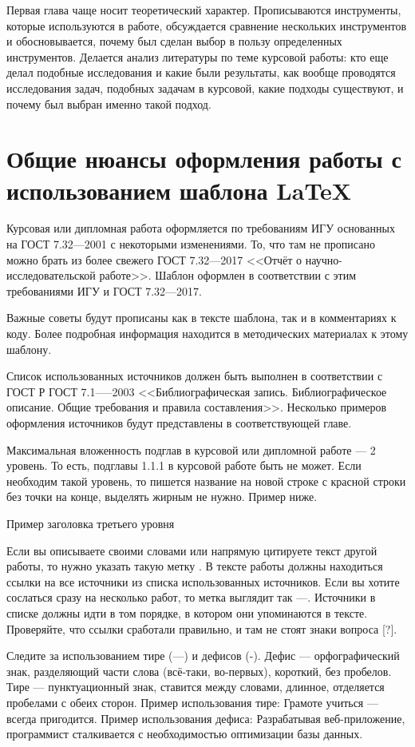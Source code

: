 \documentclass{report}
\begin{document}
Первая глава чаще носит теоретический характер. Прописываются инструменты, которые используются в работе, обсуждается сравнение нескольких инструментов и обосновывается, почему был сделан выбор в пользу определенных инструментов. Делается анализ литературы по теме курсовой работы: кто еще делал подобные исследования и какие были результаты, как вообще проводятся исследования задач, подобных задачам в курсовой, какие подходы существуют, и почему был выбран именно такой подход.

\section{Общие нюансы оформления работы с использованием шаблона \LaTeX}
Курсовая или дипломная работа оформляется по требованиям ИГУ основанных на ГОСТ 7.32---2001 с некоторыми изменениями. То, что там не прописано можно брать из более свежего ГОСТ 7.32---2017 <<Отчёт о научно-исследовательской работе>>. Шаблон оформлен в соответствии с этим требованиями ИГУ и ГОСТ 7.32---2017. 

Важные советы будут прописаны как в тексте шаблона, так и в комментариях к коду. Более подробная информация находится в методических материалах к этому шаблону.

Список использованных источников должен быть выполнен в соответствии с ГОСТ Р ГОСТ 7.1—--2003 <<Библиографическая запись. Библиографическое описание. Общие требования и правила составления>>. Несколько примеров оформления источников будут представлены в соответствующей главе.

Максимальная вложенность подглав в курсовой или дипломной работе --- 2 уровень. То есть, подглавы 1.1.1 в курсовой работе быть не может. Если необходим такой уровень, то пишется название на новой строке с красной строки без точки на конце, выделять жирным не нужно. Пример ниже.

Пример заголовка третьего уровня

Если вы описываете своими словами или напрямую цитируете текст другой работы, то нужно указать такую метку \cite{bib_gost1}. В тексте работы должны находиться ссылки на все источники из списка использованных источников. Если вы хотите сослаться сразу на несколько работ, то метка выглядит так \cite{bib_gost2}---\cite{bib_electr_res}. Источники в списке должны идти в том порядке, в котором они упоминаются в тексте. Проверяйте, что ссылки сработали правильно, и там не стоят знаки вопроса [?].

Следите за использованием тире (---) и дефисов (-). Дефис — орфографический знак, разделяющий части слова (всё-таки, во-первых), короткий, без пробелов.
Тире — пунктуационный знак, ставится между словами, длинное, отделяется пробелами с обеих сторон. Пример использования тире: Грамоте учиться — всегда пригодится. Пример использования дефиса: Разрабатывая веб-приложение, программист сталкивается с необходимостью оптимизации базы данных.
\end{document}
